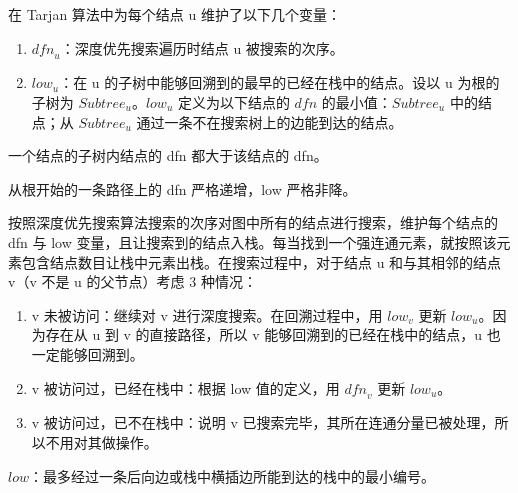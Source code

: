 在 Tarjan 算法中为每个结点 u 维护了以下几个变量：
\begin{enumerate}
    \item $\textit{dfn}_u$：深度优先搜索遍历时结点 u 被搜索的次序。
    \item $\textit{low}_u$：在 u 的子树中能够回溯到的最早的已经在栈中的结点。设以 u 为根的子树为 $\textit{Subtree}_u$。$\textit{low}_u$ 定义为以下结点的 $\textit{dfn}$ 的最小值：$\textit{Subtree}_u$ 中的结点；从 $\textit{Subtree}_u$ 通过一条不在搜索树上的边能到达的结点。
\end{enumerate}

一个结点的子树内结点的 dfn 都大于该结点的 dfn。

从根开始的一条路径上的 dfn 严格递增，low 严格非降。

按照深度优先搜索算法搜索的次序对图中所有的结点进行搜索，维护每个结点的 dfn 与 low 变量，且让搜索到的结点入栈。每当找到一个强连通元素，就按照该元素包含结点数目让栈中元素出栈。在搜索过程中，对于结点 u 和与其相邻的结点 v（v 不是 u 的父节点）考虑 3 种情况：

\begin{enumerate}
    \item v 未被访问：继续对 v 进行深度搜索。在回溯过程中，用 $\textit{low}_v$ 更新 $\textit{low}_u$。因为存在从 u 到 v 的直接路径，所以 v 能够回溯到的已经在栈中的结点，u 也一定能够回溯到。
    \item v 被访问过，已经在栈中：根据 low 值的定义，用 $\textit{dfn}_v$ 更新 $\textit{low}_u$。
    \item v 被访问过，已不在栈中：说明 v 已搜索完毕，其所在连通分量已被处理，所以不用对其做操作。
\end{enumerate}

$low$：最多经过一条后向边或栈中横插边所能到达的栈中的最小编号。